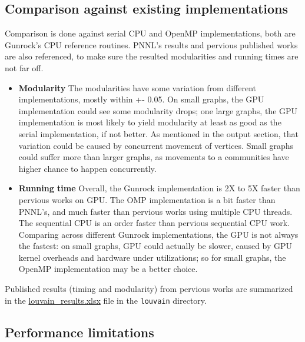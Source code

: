 \documentclass[10pt,article,oneside]{memoir}
\begin{document}
\subsection{Comparison against existing
implementations}\label{comparison-against-existing-implementations-1}

Comparison is done against serial CPU and OpenMP implementations, both
are Gunrock's CPU reference routines. PNNL's results and pervious
published works are also referenced, to make sure the resulted
modularities and running times are not far off.

\begin{itemize}
\item
  \textbf{Modularity} The modularities have some variation from
  different implementations, mostly within +- 0.05. On small graphs, the
  GPU implementation could see some modularity drops; one large graphs,
  the GPU implementation is most likely to yield modularity at least as
  good as the serial implementation, if not better. As mentioned in the
  output section, that variation could be caused by concurrent movement
  of vertices. Small graphs could suffer more than larger graphs, as
  movements to a communities have higher chance to happen concurrently.
\item
  \textbf{Running time} Overall, the Gunrock implementation is 2X to 5X
  faster than pervious works on GPU. The OMP implementation is a bit
  faster than PNNL's, and much faster than pervious works using multiple
  CPU threads. The sequential CPU is an order faster than pervious
  sequential CPU work. Comparing across different Gunrock
  implementations, the GPU is not always the fastest: on small graphs,
  GPU could actually be slower, caused by GPU kernel overheads and
  hardware under utilizations; so for small graphs, the OpenMP
  implementation may be a better choice.
\end{itemize}

Published results (timing and modularity) from pervious works are
summarized in the
\href{attachments/louvain/louvain_results.xlsx}{louvain\_results.xlsx}
file in the \texttt{louvain} directory.

\subsection{Performance limitations}\label{performance-limitations-1}
\end{document}
